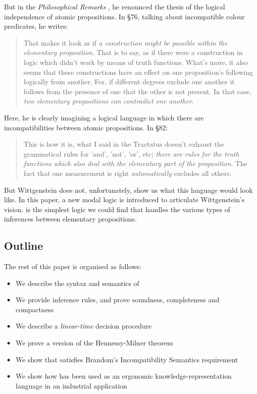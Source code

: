 But in the \emph{Philosophical Remarks} \cite{wittgenstein-remarks}, he
renounced the thesis of the logical independence of atomic
propositions.  In \S 76, talking about incompatible colour predicates,
he writes:

\begin{quote}
  That makes it look as if \emph{a construction might be possible
    within the elementary proposition}. That is to say, as if there
  were a construction in logic which didn't work by means of truth
  functions.  What's more, it also seems that these constructions have
  an effect on one proposition's following logically from another.
  For, if different degrees exclude one another it follows from the
  presence of one that the other is not present.  In that case,
  \emph{two elementary propositions can contradict one another}.
\end{quote}

\NI Here, he is clearly imagining a logical language in which there
are incompatibilities between atomic propositions. In \S 82:

\begin{quote}
  This is how it is, what I said in the Tractatus doesn't exhaust the
  grammatical rules for 'and', 'not', 'or', etc; \emph{there are rules
    for the truth functions which also deal with the elementary part
    of the proposition}.  The fact that one measurement is right
  \emph{automatically} excludes all others.
\end{quote}

\NI But Wittgenstein does not, unfortunately, show us what this
language would look like.  In this paper, a new modal logic is
introduced to articulate Wittgenstein's vision.  \ELFULL{} is the simplest logic we could find that handles the various types of inferences between elementary propositions.

\subsection{Outline}
The rest of this paper is organised as follows:
\begin{itemize}
\item
We describe the syntax and semantics of \ELFULL{}
\item
We provide inference rules, and prove soundness, completeness and compactness
\item
We describe a \emph{linear-time} decision procedure
\item
We prove a version of the Hennessy-Milner theorem
\item
We show that \ELFULL{} satisfies Brandom's Incompatibility Semantics requirement
\item
We show how \ELFULL{} has been used as an ergonomic knowledge-representation language in an industrial application
\end{itemize}

